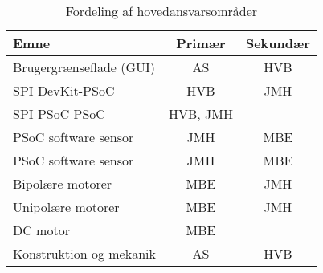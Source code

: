 \begin{table}
	\centering
	\begin{tabular}{| l | c | c |}
		\hline
		Emne & Primær & Sekundær\\\hline
		Brugergrænseflade (GUI) & AS & HVB\\\hline
		SPI DevKit-PSoC & HVB & JMH\\\hline
		SPI PSoC-PSoC & HVB, JMH & \\\hline
		PSoC software sensor & JMH & MBE\\\hline
		PSoC software sensor & JMH & MBE\\\hline
		Bipolære motorer & MBE & JMH\\\hline
		Unipolære motorer & MBE & JMH\\\hline
		DC motor & MBE & \\\hline
		Konstruktion og mekanik & AS & HVB\\\hline
	\end{tabular}
	\caption{Fordeling af hovedansvarsområder}
	\label{tab:ansvar}
\end{table}